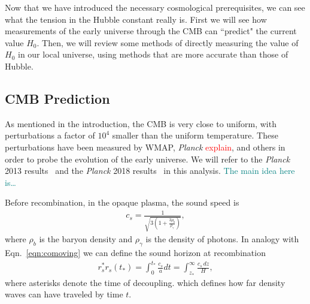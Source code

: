 \documentclass[12pt]{article}
\renewcommand{\l}{\ell}
\newcommand{\ex}[1]{\left\langle#1\right\rangle}
\renewcommand{\th}[1]{\frac{1}{#1}}
\newcommand{\note}[1]{\textcolor{red}{#1}}
\newcommand{\outline}[1]{\textcolor{teal}{#1}}
\newcommand{\Planck}[1]{\textit{Planck}}
\begin{document}
Now that we have introduced the necessary cosmological prerequisites, we can see what the tension in the Hubble constant really is. First we will see how measurements of the early universe through the CMB can ``predict" the current value $H_0$. Then, we will review some methods of directly measuring the value of $H_0$ in our local universe, using methods that are more accurate than those of Hubble.

\subsection{CMB Prediction} \label{sub:predic}

As mentioned in the introduction, the CMB is very close to uniform, with perturbations a factor of $10^4$ smaller than the uniform temperature. These perturbations have been measured by WMAP, \Planck{} \note{explain}, and others in order to probe the evolution of the early universe. We will refer to the \Planck{} 2013 results~\cite{Planck2013} and the \Planck{} 2018 results~\cite{Planck2018} in this analysis. \outline{The main idea here is\dots}

%

Before recombination, in the opaque plasma, the sound speed is 
\begin{align}
c_s = \th{\sqrt{3(1+\frac{3\rho_b}{\rho_\gamma})}},
\end{align}
where $\rho_b$ is the baryon density and $\rho_\gamma$ is the density of photons. In analogy with Eqn.~\ref{eqn:comoving} we can define the sound horizon at recombination~\cite{Planck2013}
\begin{align}
r_s^*r_s(t_*) = \int_0^{t_*} \frac{c_s}{a} dt = \int_{z_*}^\infty \frac{c_s\, dz}{H}, \label{eqn:rs}
\end{align}
where asterisks denote the time of decoupling.
which defines how far density waves can have traveled by  time $t$. 
\end{document}
